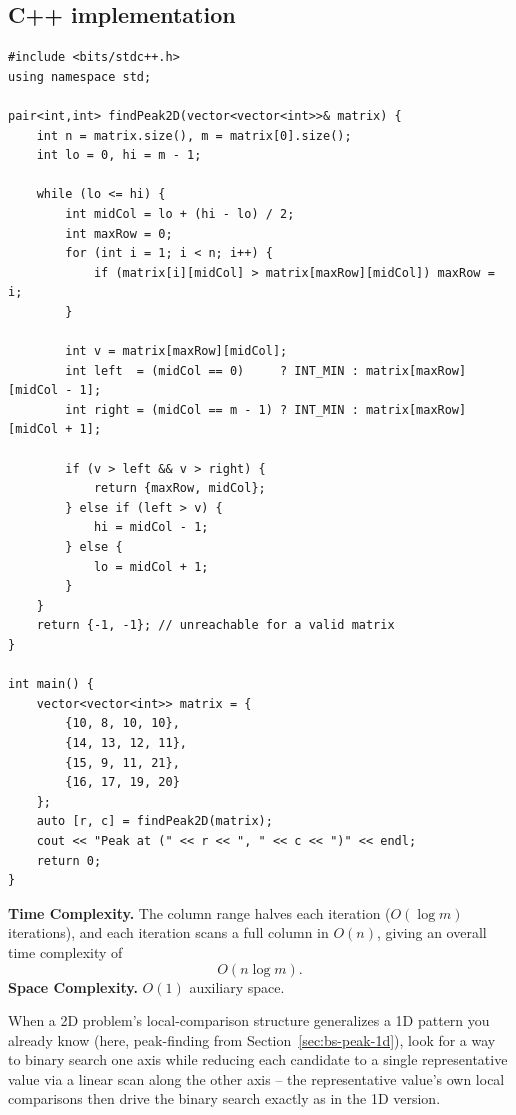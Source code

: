 \subsection*{C++ implementation}

\begin{lstlisting}
#include <bits/stdc++.h>
using namespace std;

pair<int,int> findPeak2D(vector<vector<int>>& matrix) {
    int n = matrix.size(), m = matrix[0].size();
    int lo = 0, hi = m - 1;

    while (lo <= hi) {
        int midCol = lo + (hi - lo) / 2;
        int maxRow = 0;
        for (int i = 1; i < n; i++) {
            if (matrix[i][midCol] > matrix[maxRow][midCol]) maxRow = i;
        }

        int v = matrix[maxRow][midCol];
        int left  = (midCol == 0)     ? INT_MIN : matrix[maxRow][midCol - 1];
        int right = (midCol == m - 1) ? INT_MIN : matrix[maxRow][midCol + 1];

        if (v > left && v > right) {
            return {maxRow, midCol};
        } else if (left > v) {
            hi = midCol - 1;
        } else {
            lo = midCol + 1;
        }
    }
    return {-1, -1}; // unreachable for a valid matrix
}

int main() {
    vector<vector<int>> matrix = {
        {10, 8, 10, 10},
        {14, 13, 12, 11},
        {15, 9, 11, 21},
        {16, 17, 19, 20}
    };
    auto [r, c] = findPeak2D(matrix);
    cout << "Peak at (" << r << ", " << c << ")" << endl;
    return 0;
}
\end{lstlisting}

\begin{complexitybox}
\textbf{Time Complexity.} The column range halves each iteration
($O(\log m)$ iterations), and each iteration scans a full column in
$O(n)$, giving an overall time complexity of
\[
  O(n \log m).
\]
\textbf{Space Complexity.} $O(1)$ auxiliary space.
\end{complexitybox}

\begin{takeawaybox}
When a 2D problem's local-comparison structure generalizes a 1D pattern
you already know (here, peak-finding from
Section~\ref{sec:bs-peak-1d}), look for a way to binary search one axis
while reducing each candidate to a single representative value via a
linear scan along the other axis -- the representative value's own local
comparisons then drive the binary search exactly as in the 1D version.
\end{takeawaybox}
